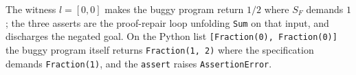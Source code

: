 \noindent
The witness $l = [0,0]$ makes the buggy program return $1/2$ where
$S_F$ demands $1$; the three asserts are the proof-repair loop unfolding
\texttt{Sum} on that input, and \daf{} discharges the negated goal. 
On the Python list \texttt{[Fraction(0), Fraction(0)]} the buggy program itself returns
\texttt{Fraction(1, 2)} where the specification demands \texttt{Fraction(1)}, and the
\texttt{assert} raises \texttt{AssertionError}. 

